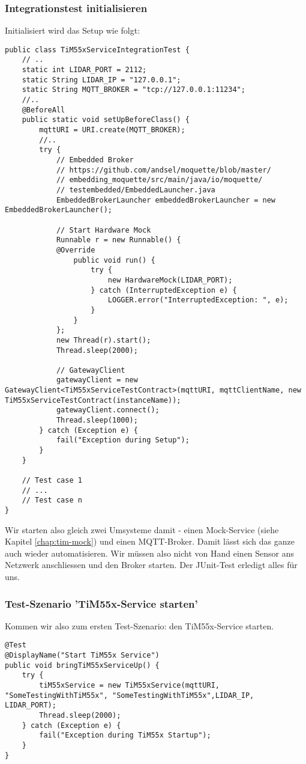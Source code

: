 \subsubsection{Integrationstest initialisieren}
Initialisiert wird das Setup wie folgt:
\begin{lstlisting}[caption={Integrations-Test Setup für TiM55x},label={lst:integrationstest-tim55x-setup}]
public class TiM55xServiceIntegrationTest {
    // ..
    static int LIDAR_PORT = 2112;
    static String LIDAR_IP = "127.0.0.1";
    static String MQTT_BROKER = "tcp://127.0.0.1:11234";
    //.. 
    @BeforeAll
    public static void setUpBeforeClass() {
        mqttURI = URI.create(MQTT_BROKER);
        //..
        try {
            // Embedded Broker
            // https://github.com/andsel/moquette/blob/master/
            // embedding_moquette/src/main/java/io/moquette/
            // testembedded/EmbeddedLauncher.java
            EmbeddedBrokerLauncher embeddedBrokerLauncher = new EmbeddedBrokerLauncher();

            // Start Hardware Mock
            Runnable r = new Runnable() {
            @Override
                public void run() {
                    try {
                        new HardwareMock(LIDAR_PORT);
                    } catch (InterruptedException e) {
                        LOGGER.error("InterruptedException: ", e);
                    }
                }
            };
            new Thread(r).start();
            Thread.sleep(2000);

            // GatewayClient
            gatewayClient = new GatewayClient<TiM55xServiceTestContract>(mqttURI, mqttClientName, new TiM55xServiceTestContract(instanceName));
            gatewayClient.connect();
            Thread.sleep(1000);
        } catch (Exception e) {
            fail("Exception during Setup");
        } 
    }
    
    // Test case 1
    // ...
    // Test case n
}
\end{lstlisting}
Wir starten also gleich zwei Umsysteme damit - einen Mock-Service (siehe Kapitel \ref{chap:tim-mock}) und einen MQTT-Broker. Damit lässt sich das ganze auch wieder automatisieren. Wir müssen also nicht von Hand einen Sensor ans Netzwerk anschliessen und den Broker starten. Der JUnit-Test erledigt alles für uns.
\subsubsection{Test-Szenario 'TiM55x-Service starten'}
Kommen wir also zum ersten Test-Szenario: den TiM55x-Service starten.
\begin{lstlisting}[caption={TiM55x Startup-Test}]
@Test
@DisplayName("Start TiM55x Service")
public void bringTiM55xServiceUp() {
    try {
        tiM55xService = new TiM55xService(mqttURI, "SomeTestingWithTiM55x", "SomeTestingWithTiM55x",LIDAR_IP, LIDAR_PORT);
        Thread.sleep(2000);
    } catch (Exception e) {
        fail("Exception during TiM55x Startup");
    }
}
\end{lstlisting}


